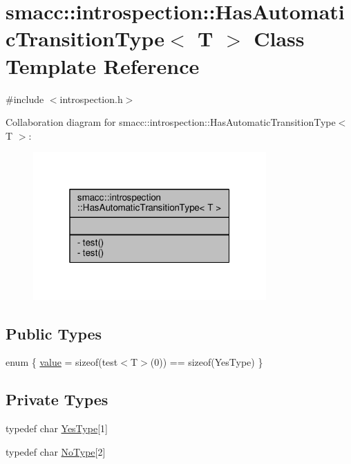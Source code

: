 \hypertarget{classsmacc_1_1introspection_1_1HasAutomaticTransitionType}{}\section{smacc\+:\+:introspection\+:\+:Has\+Automatic\+Transition\+Type$<$ T $>$ Class Template Reference}
\label{classsmacc_1_1introspection_1_1HasAutomaticTransitionType}


{\ttfamily \#include $<$introspection.\+h$>$}



Collaboration diagram for smacc\+:\+:introspection\+:\+:Has\+Automatic\+Transition\+Type$<$ T $>$\+:\nopagebreak
\begin{figure}[H]
\begin{center}
\leavevmode
\includegraphics[width=253pt]{classsmacc_1_1introspection_1_1HasAutomaticTransitionType__coll__graph}
\end{center}
\end{figure}
\subsection*{Public Types}
\begin{DoxyCompactItemize}
\item 
enum \{ \hyperlink{classsmacc_1_1introspection_1_1HasAutomaticTransitionType_ac663d77745eac0f2b2ceb29e4c8b300ba8aba42189dc17891761a49375684776d}{value} = sizeof(test$<$T$>$(0)) == sizeof(Yes\+Type)
 \}
\end{DoxyCompactItemize}
\subsection*{Private Types}
\begin{DoxyCompactItemize}
\item 
typedef char \hyperlink{classsmacc_1_1introspection_1_1HasAutomaticTransitionType_abeb599df547eb3db36684b6cb343eade}{Yes\+Type}\mbox{[}1\mbox{]}
\item 
typedef char \hyperlink{classsmacc_1_1introspection_1_1HasAutomaticTransitionType_aa2e976214fc770f53aaae67fc049caab}{No\+Type}\mbox{[}2\mbox{]}
\end{DoxyCompactItemize}
